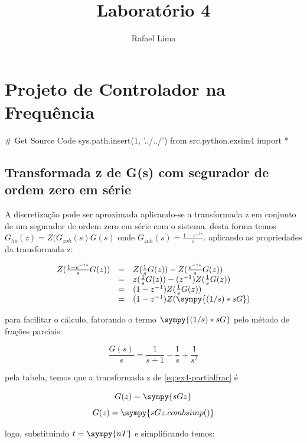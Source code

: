 \documentclass[a4paper,11pt]{article}
\title{Laboratório 4} %
\author{Rafael Lima}
\begin{document}

\section{Projeto de Controlador na Frequência}

\begin{sympycode}
# Get Source Code
sys.path.insert(1, '../../')
from src.python.exsim4 import *
\end{sympycode}

\subsection{Transformada z de G(s) com segurador de ordem zero em série}

A discretização pode ser aproximada aplicando-se a transformada z em conjunto de um segurador de ordem zero em série com o sistema. desta forma temos $G_{ho}(z) = Z(G_{zoh}(s)G(s)$ onde $G_{zoh}(s) = \frac{1-e^{-ts}}{s}$. aplicando as propriedades da transformada z:

$$
\begin{array}{lcl}
    Z(\frac{1-e^{-ts}}{s}G(z)) &=& Z(\frac{1}{s}G(z)) - Z(\frac{e^{-ts}}{s}G(z))\\
    &=& z(\frac{1}{s}G(z)) - (z^{-1})Z(\frac{1}{s}G(z))\\
    &=& (1 - z^{-1})Z(\frac{1}{s}G(z))\\
    &=& (1 - z^{-1})Z(\sympy{(1/s)*sG})\\
\end{array}
$$

para facilitar o cálculo, fatorando o termo $\sympy{(1/s)*sG}$ pelo método de frações parciais:

\begin{equation}\label{eq:ex4-partialfrac}
\frac{G(s)}{s} = \frac{1}{s+1}-\frac{1}{s}+\frac{1}{s^2}
\end{equation}

pela tabela, temos que a transformada z de \ref{eq:ex4-partialfrac} é

$$G(z) = \sympy{sGz}$$
$$G(z) = \sympy{sGz.combsimp()}$$

logo, substituindo $t = \sympy{nT}$ e simplificando temos:
\end{document}
